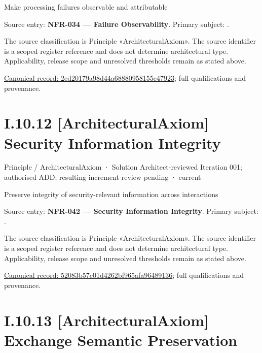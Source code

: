 Make processing failures observable and attributable



Source entry: \textbf{NFR-034 — Failure Observability}. Primary subject: \texttt{}.



The source classification is Principle «ArchitecturalAxiom». The source identifier is a scoped register reference and does not determine architectural type. Applicability, release scope and unresolved thresholds remain as stated above.


{\footnotesize \href{../../../../continuum/motivation/principle/architectural-axiom/2ed20179a98d44a68880958155e47923.md}{Canonical record: 2ed20179a98d44a68880958155e47923}; full qualifications and provenance.}\par
\section*{I.10.12 [ArchitecturalAxiom] Security Information Integrity}
\label{navigation:I.10.12}

\label{element:52083b57c01d4262bf965afa96489136}
{\small Principle / ArchitecturalAxiom · Solution Architect-reviewed Iteration 001; authorised ADD; resulting increment review pending · current}\par

Preserve integrity of security-relevant information across interactions



Source entry: \textbf{NFR-042 — Security Information Integrity}. Primary subject: \texttt{}.



The source classification is Principle «ArchitecturalAxiom». The source identifier is a scoped register reference and does not determine architectural type. Applicability, release scope and unresolved thresholds remain as stated above.


{\footnotesize \href{../../../../continuum/motivation/principle/architectural-axiom/52083b57c01d4262bf965afa96489136.md}{Canonical record: 52083b57c01d4262bf965afa96489136}; full qualifications and provenance.}\par
\section*{I.10.13 [ArchitecturalAxiom] Exchange Semantic Preservation}
\label{navigation:I.10.13}

